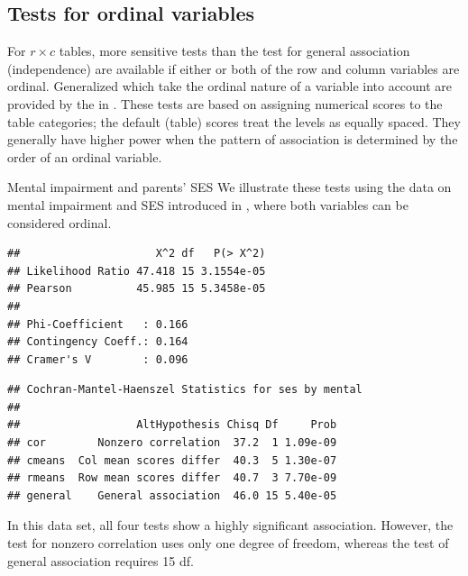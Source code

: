 \documentclass[11pt]{book}
\renewenvironment{knitrout}{\small\renewcommand{\baselinestretch}{.85}}{} %
\begin{document}
\subsection{Tests for ordinal variables}\label{sec:ordinaltests}

For \(r \times  c\) tables, more sensitive tests 
than the test for general association (independence)
are available if
either or both of the row and column variables are
ordinal. Generalized  
\citep{Landis-etal:1978}
which take the ordinal nature of a variable into
account are provided by the  in .
These tests are based on assigning numerical scores to
the table categories;  the default (table) scores treat the levels as
equally spaced.  They generally have higher power when the pattern of
association is determined by the order of an ordinal variable.

\begin{Example}[mental2]{Mental impairment and parents' SES}
We illustrate these tests using the data on mental impairment and SES
introduced in , where both variables can be considered ordinal.
\begin{knitrout}
\color{fgcolor}\begin{kframe}
\begin{alltt}
 \hlstd{=}\hlstd{)}
 \hlkwb{<-}  \hlopt{~}  \hlopt{+}  
    
\end{alltt}
\begin{verbatim}
##                     X^2 df   P(> X^2)
## Likelihood Ratio 47.418 15 3.1554e-05
## Pearson          45.985 15 5.3458e-05
## 
## Phi-Coefficient   : 0.166 
## Contingency Coeff.: 0.164 
## Cramer's V        : 0.096
\end{verbatim}
\begin{alltt}
       
\end{alltt}
\begin{verbatim}
## Cochran-Mantel-Haenszel Statistics for ses by mental 
## 
##                  AltHypothesis Chisq Df     Prob
## cor        Nonzero correlation  37.2  1 1.09e-09
## cmeans  Col mean scores differ  40.3  5 1.30e-07
## rmeans  Row mean scores differ  40.7  3 7.70e-09
## general    General association  46.0 15 5.40e-05
\end{verbatim}
\end{kframe}
\end{knitrout}
In this data set, all four tests show a highly significant association.
However, the  test for nonzero correlation uses only one 
degree of freedom, whereas the test of general association requires
15 df.
\end{Example}
\end{document}
